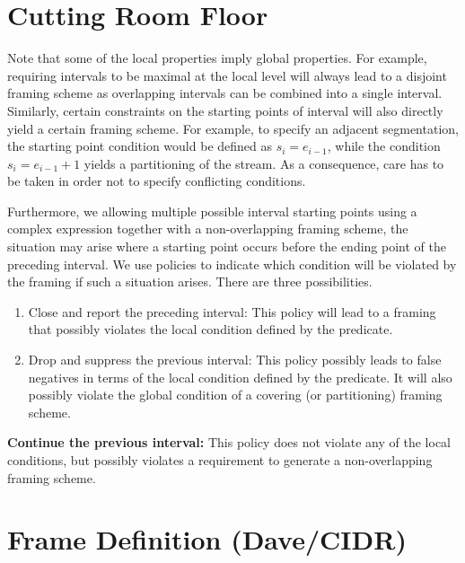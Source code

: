 \documentclass{vldb}
\begin{document}
\nocite{*}




\begin{appendix}

\section{Cutting Room Floor}

Note that some of the local properties imply global properties. For example, requiring intervals to be maximal at the local level will always lead to a disjoint framing scheme as overlapping intervals can be combined into a single interval. Similarly, certain constraints on the starting points of interval will also directly yield a certain framing scheme. For example, to specify an adjacent segmentation, the starting point condition would be defined as $s_i=e_{i-1}$, while the condition $s_i=e_{i-1}+1$ yields a partitioning of the stream. As a consequence, care has to be taken in order not to specify conflicting conditions.

Furthermore, we allowing multiple possible interval starting points using a complex expression together with a non-overlapping framing scheme, the situation may arise where a starting point occurs before the ending point of the preceding interval. We use policies to indicate which condition will be violated by the framing if such a situation arises. There are three possibilities.
\begin{enumerate}
\item Close and report the preceding interval: This policy will lead to a framing that possibly violates the local condition defined by the predicate.
\item Drop and suppress the previous interval: This policy possibly leads to false negatives in terms of the local condition defined by the predicate. It will also possibly violate the global condition of a covering (or partitioning) framing scheme.
\end{enumerate}

\textbf{Continue the previous interval:} This policy does not violate any of the local conditions, but possibly violates a requirement to generate a non-overlapping framing scheme.

\section{Frame Definition (Dave/CIDR)}
\label{sec:theory-cidr}


\end{appendix}
\end{document}
